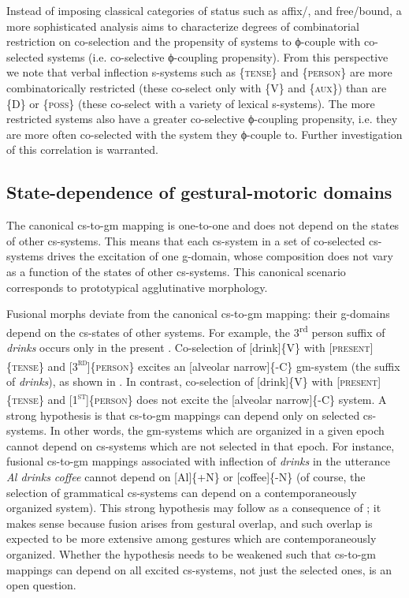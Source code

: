   Instead of imposing classical categories of  status such as affix/, and free/bound, a more sophisticated analysis aims to characterize degrees of combinatorial restriction on co-selection and the propensity of systems to ϕ-couple with co-selected systems (i.e. co-selective ϕ-coupling propensity). From this perspective we note that verbal inflection s-systems such as \{\textsc{tense}\} and \{\textsc{person}\} are more combinatorically restricted (these co-select only with \{V\} and \{\textsc{aux}\}) than are \{D\} or \{\textsc{poss}\} (these co-select with a variety of lexical s-systems). The more restricted systems also have a greater co-selective ϕ-coupling propensity, i.e. they are more often co-selected with the system they ϕ-couple to. Further investigation of this correlation is warranted.

\subsection{State-dependence of gestural-motoric domains}

The canonical cs-to-gm mapping is one-to-one and does not depend on the states of other cs-systems. This means that each cs-system in a set of co-selected cs-systems drives the excitation of one g-domain, whose composition does not vary as a function of the states of other cs-systems. This canonical scenario corresponds to prototypical agglutinative morphology. 

  Fusional morphs deviate from the canonical cs-to-gm mapping: their g-domains depend on the cs-states of other systems. For example, the 3\textsuperscript{rd} person suffix of \textit{drinks} occurs only in the present . Co-selection of [drink]\{V\} with [\textsc{present}]\{\textsc{tense}\} and [\textsc{3}\textsc{\textsuperscript{rd}}]\{\textsc{person}\} excites an [alveolar narrow]\{-C\} gm-system (the suffix of \textit{drinks}), as shown in {}. In contrast, co-selection of [drink]\{V\} with [\textsc{present]}\{\textsc{tense}\} and [\textsc{1}\textsc{\textsuperscript{st}}]\{\textsc{person}\} does not excite the [alveolar narrow]\{-C\} system. A strong hypothesis is that cs-to-gm mappings can depend only on selected cs-systems. In other words, the gm-systems which are organized in a given epoch cannot depend on cs-systems which are not selected in that epoch. For instance, fusional cs-to-gm mappings associated with inflection of \textit{drinks} in the utterance \textit{Al drinks coffee} cannot depend on [Al]\{+N\} or [coffee]\{-N\} (of course, the selection of grammatical cs-systems can depend on a contemporaneously organized system). This strong hypothesis may follow as a consequence of ; it makes sense because fusion arises from gestural overlap, and such overlap is expected to be more extensive among gestures which are contemporaneously organized. Whether the hypothesis needs to be weakened such that cs-to-gm mappings can depend on all excited cs-systems, not just the selected ones, is an open question.


